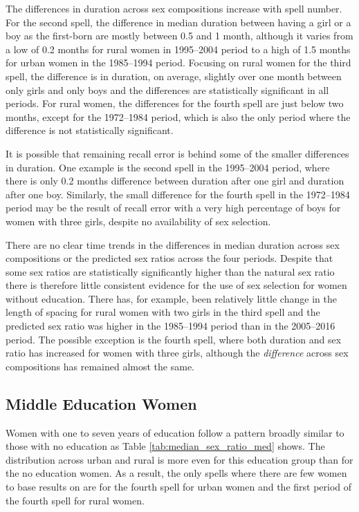 \documentclass[12pt,letterpaper]{article}
\begin{document}
The differences in duration across sex compositions increase with 
spell number.
For the second spell, the difference in median duration between
having a girl or a boy as the first-born are mostly between 0.5 and 1 
month, although it varies from a low of 0.2 months for rural women 
in 1995--2004 period to a high of 1.5 months
for urban women in the 1985--1994 period.
Focusing on rural women for the third spell, the difference is in
duration, on average, slightly over one month between only girls and only boys 
and the differences are statistically significant in all periods.
For rural women, the differences for the fourth spell are just below
two months, except for the 1972--1984 period, which is
also the only period where the difference is not statistically significant.

It is possible that remaining recall error is behind some of the
smaller differences in duration.
One example is the second spell in the 1995--2004 period, where there 
is only 0.2 months difference between duration after one girl and 
duration after one boy.
Similarly, the small difference for the fourth spell in the 1972--1984
period may be the result of recall error with a very high 
percentage of boys for women with three girls, despite no availability
of sex selection.

There are no clear time trends in the differences in median duration
across sex compositions or the predicted sex ratios across the four periods.
Despite that some sex ratios are statistically significantly higher 
than the natural sex ratio there is therefore little consistent evidence 
for the use of sex selection for women without education.
There has, for example, been relatively little change in the length
of spacing for rural women with two girls in the third spell and 
the predicted sex ratio was higher in the 1985--1994 period
than in the 2005--2016 period.
The possible exception is the fourth spell, where both duration 
and sex ratio has increased for women with three girls, although
the \emph{difference} across sex compositions has remained almost
the same.

\subsection{Middle Education Women}



Women with one to seven years of education follow a pattern
broadly similar to those with no education as 
Table \ref{tab:median_sex_ratio_med} shows.
The distribution across urban and rural is more even for this education
group than for the no education women.
As a result, the only spells where there are few women to base 
results on are for the fourth spell for urban women and the first 
period of the fourth spell for rural women.
\end{document}
